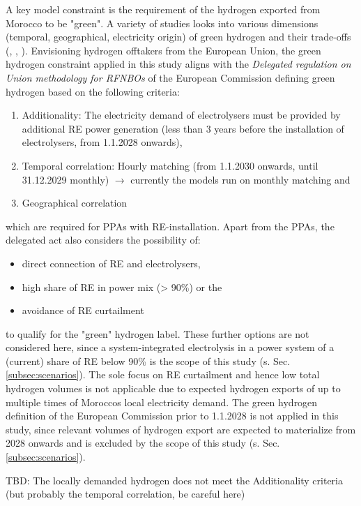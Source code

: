 A key model constraint is the requirement of the hydrogen exported from Morocco to be "green". A variety of studies looks into various dimensions (temporal, geographical, electricity origin) of green hydrogen and their trade-offs (\cite{Brauer2022}, \cite{Ruhnau2022}, \cite{Zeyen2022}). Envisioning hydrogen offtakers from the European Union, the green hydrogen constraint applied in this study aligns with the \emph{Delegated regulation on Union methodology for RFNBOs} of the European Commission \cite{Commission2023} defining green hydrogen  based on the following criteria:

\begin{enumerate}
    \item Additionality: The electricity demand of electrolysers must be provided by additional RE power generation (less than 3 years before the installation of electrolysers, from 1.1.2028 onwards),
    \item Temporal correlation: Hourly matching (from 1.1.2030 onwards, until 31.12.2029 monthly) $\rightarrow$ currently the models run on monthly matching and
    \item Geographical correlation
\end{enumerate}
which are required for PPAs with RE-installation. Apart from the PPAs, the delegated act also considers the possibility of:
\begin{itemize}
    \item direct connection of RE and electrolysers,
    \item high share of RE in power mix (> 90\%) or the
    \item avoidance of RE curtailment
\end{itemize}
to qualify for the "green" hydrogen label. These further options are not considered here, since a system-integrated electrolysis in a power system of a (current) share of RE below 90\% is the scope of this study (s. Sec. \ref{subsec:scenarios}). The sole focus on RE curtailment and hence low total hydrogen volumes is not applicable due to expected hydrogen exports of up to multiple times of Moroccos local electricity demand. The green hydrogen definition of the European Commission prior to 1.1.2028 is not applied in this study, since relevant volumes of hydrogen export are expected to materialize from 2028 onwards and is excluded by the scope of this study (s. Sec. \ref{subsec:scenarios}).

TBD: The locally demanded hydrogen does not meet the Additionality criteria (but probably the temporal correlation, be careful here)

